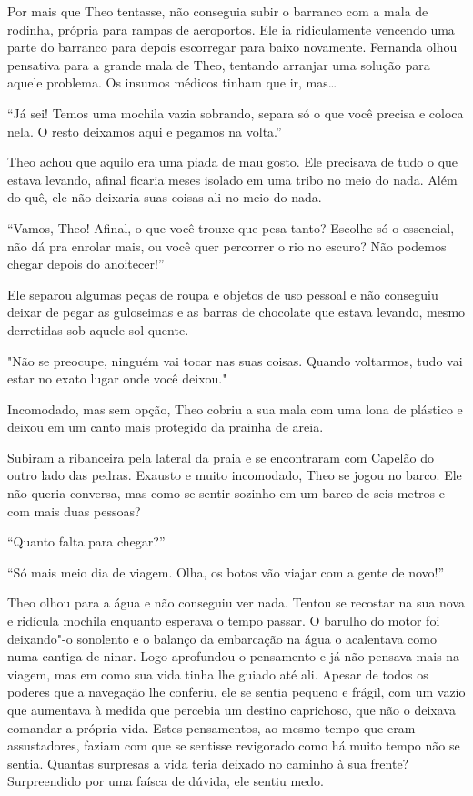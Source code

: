 Por mais que Theo tentasse, não conseguia subir o barranco com a mala de
rodinha, própria para rampas de aeroportos. Ele ia ridiculamente
vencendo uma parte do barranco para depois escorregar para baixo
novamente. Fernanda olhou pensativa para a grande mala de Theo, tentando
arranjar uma solução para aquele problema. Os insumos médicos tinham que
ir, mas\ldots{}

``Já sei! Temos uma mochila vazia sobrando, separa só o que você precisa
e coloca nela. O resto deixamos aqui e pegamos na volta.''

Theo achou que aquilo era uma piada de mau gosto. Ele precisava de tudo
o que estava levando, afinal ficaria meses isolado em uma tribo no meio
do nada. Além do quê, ele não deixaria suas coisas ali no meio do nada.

``Vamos, Theo! Afinal, o que você trouxe que pesa tanto? Escolhe só o
essencial, não dá pra enrolar mais, ou você quer percorrer o rio no
escuro? Não podemos chegar depois do anoitecer!''

Ele separou algumas peças de roupa e objetos de uso pessoal e não
conseguiu deixar de pegar as guloseimas e as barras de chocolate que
estava levando, mesmo derretidas sob aquele sol quente.

"Não se preocupe, ninguém vai tocar nas suas coisas. Quando voltarmos,
tudo vai estar no exato lugar onde você deixou."

Incomodado, mas sem opção, Theo cobriu a sua mala com uma lona de
plástico e deixou em um canto mais protegido da prainha de areia.

Subiram a ribanceira pela lateral da praia e se encontraram com Capelão do outro lado das pedras.
Exausto e muito incomodado, Theo se jogou no barco. Ele não queria conversa, mas
como se sentir sozinho em um barco de seis metros e com mais duas
pessoas?

``Quanto falta para chegar?''

``Só mais meio dia de viagem. Olha, os botos vão viajar com a gente de
novo!''

Theo olhou para a água e não conseguiu ver nada. Tentou se recostar na
sua nova e ridícula mochila enquanto esperava o tempo passar. O barulho
do motor foi deixando"-o sonolento e o balanço da embarcação na água o
acalentava como numa cantiga de ninar. Logo aprofundou o pensamento e já
não pensava mais na viagem, mas em como sua vida tinha lhe guiado até
ali. Apesar de todos os poderes que a navegação lhe conferiu, ele se
sentia pequeno e frágil, com um vazio que aumentava à medida que
percebia um destino caprichoso, que não o deixava comandar a própria
vida. Estes pensamentos, ao mesmo tempo que eram assustadores, faziam
com que se sentisse revigorado como há muito tempo não se sentia.
Quantas surpresas a vida teria deixado no caminho à sua frente?
Surpreendido por uma faísca de dúvida, ele sentiu medo.

